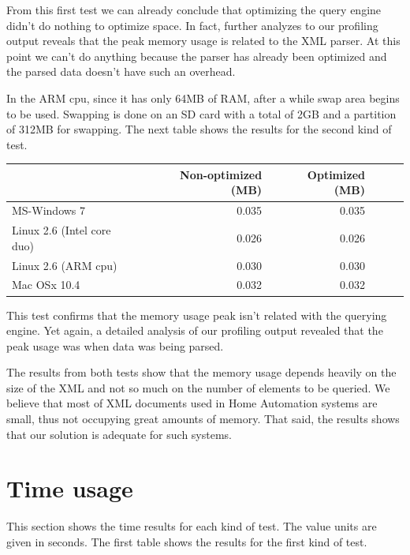 \documentclass[a4paper]{report}
\begin{document}
	From this first test we can already conclude that optimizing the query engine didn't do nothing to optimize space. In fact, further analyzes to our profiling output reveals that the peak memory usage is related to the XML 
	parser. At this point we can't do anything because the parser has already been optimized and the parsed data doesn't have such an overhead. 
	
	In the ARM cpu, since it has only 64MB of RAM, after a while swap area begins to be used. Swapping is done on an SD card with a total of 2GB and a partition of 312MB for swapping. The next table shows the results for 
	the second kind of test.
	
	\begin{center}
  			\begin{tabular}{ | l | r | r | r | r | r | }
			    \hline
				       	       		     			 & Non-optimized (MB) & Optimized (MB)\\ \hline
				    MS-Windows 7   			&  0.035  & 0.035  \\ \hline
				    Linux 2.6 (Intel core duo) 	&  0.026  & 0.026  \\ \hline
				    Linux 2.6 (ARM cpu)   		&  0.030  & 0.030 \\ \hline
				    Mac OSx 10.4   			&  0.032  & 0.032 \\ 
			    \hline
			\end{tabular}		   
	\end{center}
	
	This test confirms that the memory usage peak isn't related with the querying engine. Yet again, a detailed analysis of our profiling output revealed that the peak usage was when data was being parsed.
	
	The results from both tests show that the memory usage depends heavily on the size of the XML and not so much on the number of elements to be queried. We believe that most of XML documents used in Home 
	Automation systems are small, thus not occupying great amounts of memory. That said, the results shows that our solution is adequate for such systems.
	
\section{Time usage}\label{sec:tprof}
	This section shows the time results for each kind of test. The value units are given in seconds. The first table shows the results for the first kind of test.
	
\end{document}
